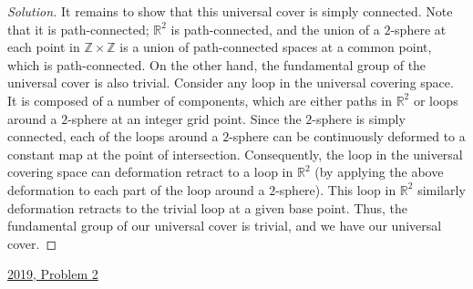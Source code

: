 \documentclass[11pt]{article}
\newcommand{\R}{\mathbb{R}}
\newcommand{\Z}{\mathbb{Z}}
\newenvironment{solution}
  {\renewcommand\qedsymbol{$\blacksquare$}\begin{proof}[Solution]}
  {\end{proof}}
\begin{document}
\begin{enumerate}[a)]
\begin{solution}
    It remains to show that this universal cover is simply connected. Note that it is path-connected; $\R^2$ is path-connected, and the union of
    a $2$-sphere at each point in $\Z \times \Z$ is a union of path-connected spaces at a common point, which is path-connected. On the other hand,
    the fundamental group of the universal cover is also trivial. Consider any loop in the universal covering space. It is composed of a number of components, which are either paths in $\R^2$ or
    loops around a $2$-sphere at an integer grid point. Since the $2$-sphere is simply connected, each of the loops around a $2$-sphere can be continuously deformed to a constant map at the point of intersection. Consequently,
    the loop in the universal covering space can deformation retract to a loop in $\R^2$ (by applying the above deformation to each part of the loop around a $2$-sphere). This loop in $\R^2$ similarly deformation retracts to the trivial loop at a given base point. 
    Thus, the fundamental group of our universal cover is trivial, and we have our universal cover.
    \end{solution}
\end{enumerate}

\newpage

\underline{2019, Problem 2} \\
\end{document}
